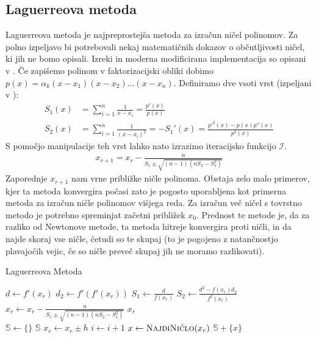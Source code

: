 \subsection{Laguerreova metoda}
Laguerreova metoda je najpreprostejša metoda za izračun ničel polinomov. Za polno izpeljavo bi potrebovali nekaj matematičnih dokazov o občutljivosti ničel, ki jih ne bomo opisali. Izreki in moderna modificirana implementacija so opisani v \cite{lagguerrmetoda}. Če zapišemo polinom v faktorizacijski obliki dobimo $p(x) = \alpha_k (x - x_1)(x - x_2)...(x - x_n)$. Definiramo dve vsoti vrst (izpeljani v \cite{Plestenjak2010}):
\begin{align}
    S_1(x) &= \sum_{i=1}^n \frac{1}{x-x_i} = \frac{p'(x)}{p(x)}\\
    S_2(x) &= \sum_{i=1}^n \frac{1}{(x-x_i)^2} = -S_1'(x) = \frac{p'^2(x) - p(x)p''(x)}{p^2(x)}
\end{align}
S pomočjo manipulacije teh vrst \cite{Plestenjak2010} lahko nato izrazimo iteracijsko funkcijo $\mathcal{I}$.
\begin{align}
    x_{r+1} = x_r - \frac{n}{S_1 \pm \sqrt{(n-1)(nS_2-S_1^2)}}
\end{align}
Zaporednje $x_{r+1}$ nam vrne približke ničle polinoma. Obstaja zelo malo primerov, kjer ta metoda konvergira počasi zato je pogosto uporabljena kot primerna metoda za izračun ničle polinomov višjega reda. Za izračun več ničel s tovrstno metodo je potrebno spreminjat začetni približek $x_0$. Prednost te metode je, da za razliko od Newtonove metode, ta metoda hitreje konvergira proti ničli, in da najde skoraj vse ničle, četudi so te skupaj (to je pogojeno z natančnostjo plavajočih vejic, če so ničle preveč skupaj jih ne moramo razlikovati).

\begin{algorithm}[H]
\caption{Laguerreova Metoda}
\begin{algorithmic}

 
    \State $d \gets f'(x_r)$ 
    \State $d_2 \gets f'(f'(x_r))$
    \State $S_1 \gets \frac{d}{f(x_r)}$
    \State $S_2 \gets \frac{d^2 - f(x_r)d_2}{f^2(x_r)}$
    \State $x_r \gets x_r - \frac{n}{S_1 \pm \sqrt{(n-1)(nS_2-S_1^2)}}$
\EndWhile 
\State  \Return $x_r$
\EndProcedure
\\
\State $\mathbb{S} \gets \{\}$
 
     
        \State \Return $\mathbb{S}$
    \EndIf
    \State $x_r \gets x_r \pm h$ 
    \State $i \gets i + 1$ 
    \State $x \gets \Call{NajdiNičlo}{x_r}$
     
    \State $\mathbb{S} + \{x\}$ 
    \EndIf
\EndWhile 
\EndProcedure\\

\end{algorithmic}
\end{algorithm}
\newpage
